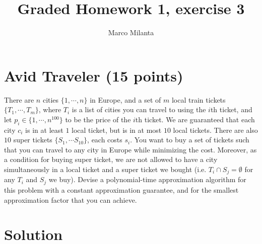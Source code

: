 \documentclass[11pt]{article}
\begin{document}
\author{Marco Milanta}
\title{Graded Homework 1, exercise 3}
\maketitle


\section*{Avid Traveler (15 points)}There are $n$ cities $\{1, \cdots, n \}$ in Europe,  and a set of $m$ local train tickets $\{T_1, \cdots, T_m\}$, where $T_i$ is a list of cities you can travel to using the $i$th ticket, and let $p_i \in \{1,\cdots,n^{100}\}$ to be the price of the $i$th ticket. We are guaranteed that each city $c_i$ is in at least $1$ local ticket, but is in at most $10$ local tickets. There are also $10$ super tickets $\{S_1, \cdots S_{10}\}$, each costs $s_i$. You want to buy a set of tickets such that you can travel to any city in Europe while minimizing the cost. Moreover, as a condition for buying super ticket, we are not allowed to have a city simultaneously in a local ticket and a super ticket we bought (i.e. $T_i\cap S_j = \emptyset$ for any $T_i$ and $S_j$ we buy). Devise a polynomial-time approximation algorithm for this problem with a constant approximation guarantee, and for the smallest approximation factor that you can achieve.

\section*{Solution}
\end{document}
